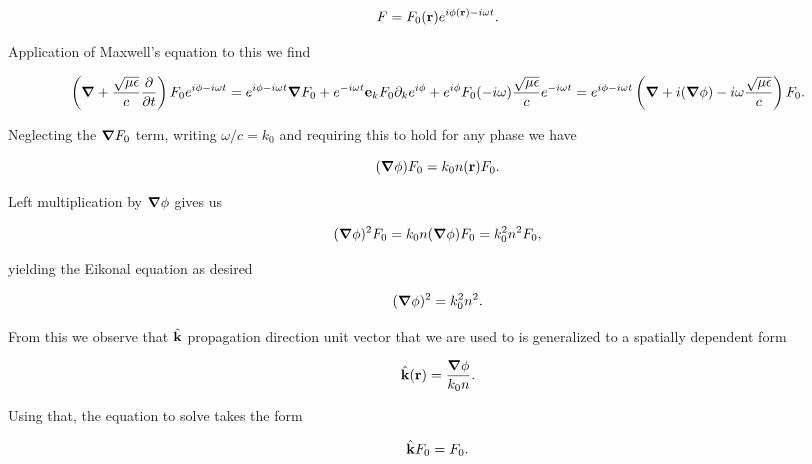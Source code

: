 {\begin{equation}\label{eqn:modernOpticsLecture2:990b}
F = F_0(\mathbf{r}) e^{i \phi(\mathbf{r}) - i\omega t}.
\end{equation}

Application of Maxwell's equation  to this we find

\begin{dmath}\label{eqn:modernOpticsLecture2:1010}
\left( \spacegrad + \frac{\sqrt{\mu \epsilon}}{c} \PD{t}{} \right) F_0
e^{i \phi - i\omega t}
=
e^{i \phi - i\omega t} \spacegrad F_0 +
e^{- i\omega t} \Be_k F_0 \partial_k e^{i \phi}
+
e^{i \phi} F_0 (-i\omega) \frac{\sqrt{\mu\epsilon}}{c} e^{-i\omega t}
=
e^{i \phi - i\omega t}
\left(
\spacegrad + i (\spacegrad \phi)
-i\omega \frac{\sqrt{\mu\epsilon}}{c}
\right) F_0.
\end{dmath}

Neglecting the $\boldsymbol{\nabla} F_0$ term, writing $\omega/c = k_0$ and requiring this to hold for any phase we have

\begin{dmath}\label{eqn:modernOpticsLecture2:1030a}
(\spacegrad \phi) F_0 = k_0 n(\Br) F_0.
\end{dmath}

Left multiplication by $\boldsymbol{\nabla} \phi$ gives us

\begin{dmath}\label{eqn:modernOpticsLecture2:1090}
(\spacegrad \phi)^2 F_0 = k_0 n (\spacegrad \phi) F_0 = k_0^2 n^2 F_0,
\end{dmath}

yielding the Eikonal equation as desired

\begin{dmath}\label{eqn:modernOpticsLecture2:1110}
(\spacegrad \phi)^2 = k_0^2 n^2.
\end{dmath}

From this we observe that $\hat{\mathbf{k}}$ propagation direction unit vector that we are used to is generalized to a spatially dependent form

\begin{dmath}\label{eqn:modernOpticsLecture2:1130a}
\kcap(\Br) = \frac{\spacegrad \phi}{k_0 n}.
\end{dmath}

Using that, the equation to solve takes the form

\begin{dmath}\label{eqn:modernOpticsLecture2:1030b}
\kcap F_0 = F_0.
\end{dmath}

}
